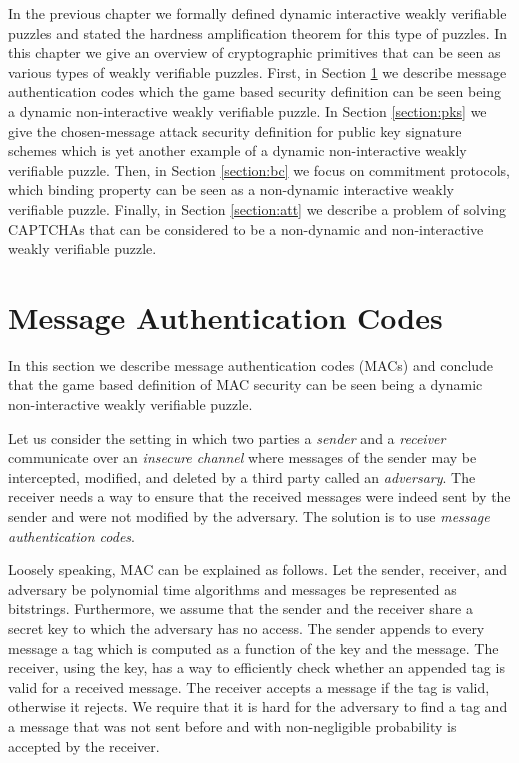 %
In the previous chapter we formally defined dynamic interactive weakly verifiable puzzles
and stated the hardness amplification theorem for this type of puzzles.
In this chapter we give an overview of cryptographic primitives that can be seen as various types of weakly verifiable puzzles.
First, in Section \ref{section:mac} we describe message authentication codes which the game based security definition can be seen being a dynamic
non-interactive weakly verifiable puzzle.
In Section \ref{section:pks} we give the chosen-message attack security definition
for public key signature schemes which is yet another example of a dynamic non-interactive weakly verifiable puzzle.
Then, in Section \ref{section:bc} we focus on commitment protocols, which binding property can be seen as a non-dynamic interactive  weakly verifiable puzzle.
Finally, in Section \ref{section:att} we describe a problem of solving CAPTCHAs that can be considered to be a non-dynamic and non-interactive weakly verifiable puzzle.

\section{Message Authentication Codes}
\label{section:mac}
In this section we describe message authentication codes (MACs) and conclude that the game based definition of MAC
security can be seen being a dynamic non-interactive weakly verifiable puzzle.

Let us consider the setting in which two parties a \textit{sender} and a \textit{receiver} communicate over an \textit{insecure channel} where
messages of the sender may be intercepted, modified, and deleted by a third party called an \textit{adversary}.
The receiver needs a way to ensure that the received messages were indeed sent by the sender and were not modified by the adversary.
The solution is to use \textit{message authentication codes}.

Loosely speaking, MAC can be explained as follows.
Let the sender, receiver, and adversary be polynomial time algorithms and messages be represented as bitstrings.
Furthermore, we assume that the sender and the receiver share a secret key to which the adversary has no access.
The sender appends to every message a tag which is computed as a function of the key and the message.
The receiver, using the key, has a way to efficiently check whether an appended tag is valid for a received message.
The receiver accepts a message if the tag is valid, otherwise it rejects.
We require that it is hard for the adversary to find a tag and a message that was not sent before and
with non-negligible probability is accepted by the receiver.

